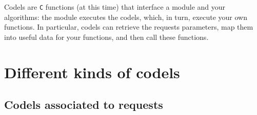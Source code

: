 %
%
%
%
%
%
%

Codels are {\tt C} functions (at this time) that interface a module and
your algorithms: the module executes the codels, which, in turn, execute
your   own functions. In   particular,  codels can retrieve  the requests
parameters,  map them into useful data  for your functions, and then call
these functions.

\section{Different kinds of codels}

\subsection{Codels associated to requests}

